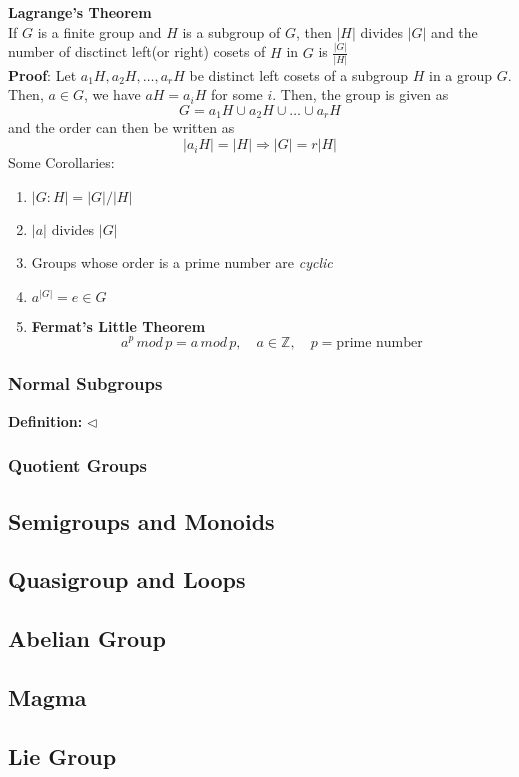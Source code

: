 \documentclass[a4paper, 12pt]{article}
\numberwithin{equation}{section}
\begin{document}
\noindent
\textbf{Lagrange's Theorem}\\
If $G$ is a finite group and $H$ is a subgroup of $G$, then $|H|$ divides $|G|$ and the number of disctinct left(or right) cosets of $H$ in $G$ is $\frac{|G|}{|H|}$\\
\textbf{Proof}: Let $a_1H, a_2H, \ldots, a_r H$ be distinct left cosets of a subgroup $H$ in a group $G$. Then, $a \in G$, we have $aH = a_i H$ for some $i$. Then, the group is given as
$$ G = a_1H \cup a_2 H \cup \ldots \cup a_r H $$
and the order can then be written as
$$ |a_i H| = |H| \Rightarrow \boxed{|G| = r|H|} $$
Some Corollaries:
\begin{enumerate}
\item $|G:H| = |G|/|H|$
\item $|a|$ divides $|G|$
\item Groups whose order is a prime number are \textit{cyclic}
\item $a^{|G|} = e \in G$
\item \textbf{Fermat's Little Theorem}$$ a^p \,mod \,p = a \,mod \,p, \quad a \in \mathbb{Z}, \quad p = \text{prime number} $$
\end{enumerate}

\subsubsection{Normal Subgroups}
\textbf{Definition:} $\lhd$

\subsubsection{Quotient Groups}



\subsection{Semigroups and Monoids}

\subsection{Quasigroup and Loops}
\subsection{Abelian Group}
\subsection{Magma}
\subsection{Lie Group}
\end{document}

